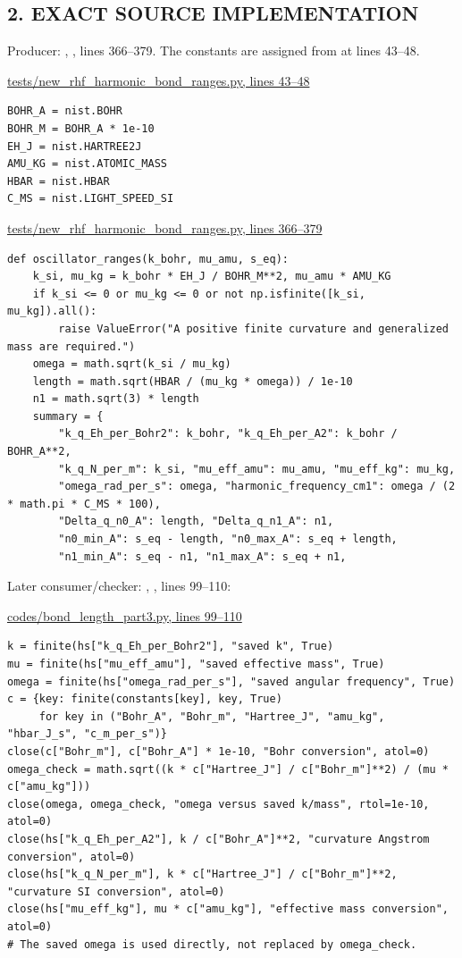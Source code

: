 \documentclass[10pt,a4paper]{article}
\begin{document}
\subsection{2. EXACT SOURCE IMPLEMENTATION}
Producer: , , lines 366–379. The constants are assigned from  at lines 43–48.

\href{/Users/novaz/Desktop/qml2.0/tests/new\_rhf\_harmonic\_bond\_ranges.py:43}{tests/new\_rhf\_harmonic\_bond\_ranges.py, lines 43–48}

\begin{Verbatim}
BOHR_A = nist.BOHR
BOHR_M = BOHR_A * 1e-10
EH_J = nist.HARTREE2J
AMU_KG = nist.ATOMIC_MASS
HBAR = nist.HBAR
C_MS = nist.LIGHT_SPEED_SI
\end{Verbatim}
\href{/Users/novaz/Desktop/qml2.0/tests/new\_rhf\_harmonic\_bond\_ranges.py:366}{tests/new\_rhf\_harmonic\_bond\_ranges.py, lines 366–379}

\begin{Verbatim}
def oscillator_ranges(k_bohr, mu_amu, s_eq):
    k_si, mu_kg = k_bohr * EH_J / BOHR_M**2, mu_amu * AMU_KG
    if k_si <= 0 or mu_kg <= 0 or not np.isfinite([k_si, mu_kg]).all():
        raise ValueError("A positive finite curvature and generalized mass are required.")
    omega = math.sqrt(k_si / mu_kg)
    length = math.sqrt(HBAR / (mu_kg * omega)) / 1e-10
    n1 = math.sqrt(3) * length
    summary = {
        "k_q_Eh_per_Bohr2": k_bohr, "k_q_Eh_per_A2": k_bohr / BOHR_A**2,
        "k_q_N_per_m": k_si, "mu_eff_amu": mu_amu, "mu_eff_kg": mu_kg,
        "omega_rad_per_s": omega, "harmonic_frequency_cm1": omega / (2 * math.pi * C_MS * 100),
        "Delta_q_n0_A": length, "Delta_q_n1_A": n1,
        "n0_min_A": s_eq - length, "n0_max_A": s_eq + length,
        "n1_min_A": s_eq - n1, "n1_max_A": s_eq + n1,
\end{Verbatim}
Later consumer/checker: , , lines 99–110:

\href{/Users/novaz/Desktop/qml2.0/codes/bond\_length\_part3.py:99}{codes/bond\_length\_part3.py, lines 99–110}

\begin{Verbatim}
k = finite(hs["k_q_Eh_per_Bohr2"], "saved k", True)
mu = finite(hs["mu_eff_amu"], "saved effective mass", True)
omega = finite(hs["omega_rad_per_s"], "saved angular frequency", True)
c = {key: finite(constants[key], key, True)
     for key in ("Bohr_A", "Bohr_m", "Hartree_J", "amu_kg", "hbar_J_s", "c_m_per_s")}
close(c["Bohr_m"], c["Bohr_A"] * 1e-10, "Bohr conversion", atol=0)
omega_check = math.sqrt((k * c["Hartree_J"] / c["Bohr_m"]**2) / (mu * c["amu_kg"]))
close(omega, omega_check, "omega versus saved k/mass", rtol=1e-10, atol=0)
close(hs["k_q_Eh_per_A2"], k / c["Bohr_A"]**2, "curvature Angstrom conversion", atol=0)
close(hs["k_q_N_per_m"], k * c["Hartree_J"] / c["Bohr_m"]**2, "curvature SI conversion", atol=0)
close(hs["mu_eff_kg"], mu * c["amu_kg"], "effective mass conversion", atol=0)
# The saved omega is used directly, not replaced by omega_check.
\end{Verbatim}
\end{document}
